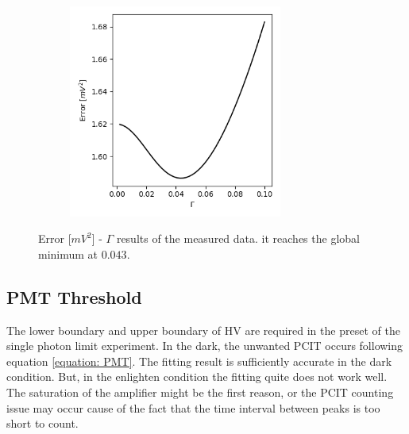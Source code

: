 \documentclass{article}
\begin{document}
\begin{figure}[H]
  \centering
  \begin{subfigure}[b]{7cm}
      \centering
      \includegraphics[width=7cm]{../results/laser_wavelength_dispersion.png}
      \caption{}
  \end{subfigure}
  \hfill
  \caption{Error [$mV^2$] - $\Gamma$ results of the measured data. it reaches the global minimum at $0.043$.}
  \label{fig: laser_dispersion}
\end{figure}

\subsection{PMT Threshold}
 The lower boundary and upper boundary of HV are required in the preset of the single photon limit experiment.
 In the dark, the unwanted PCIT occurs following equation \ref{equation: PMT}.
 The fitting result is sufficiently accurate in the dark condition.
 But, in the enlighten condition the fitting quite does not work well.
 The saturation of the amplifier might be the first reason, or the PCIT counting issue may occur cause of the fact that the time interval between peaks is too short to count.
\end{document}
